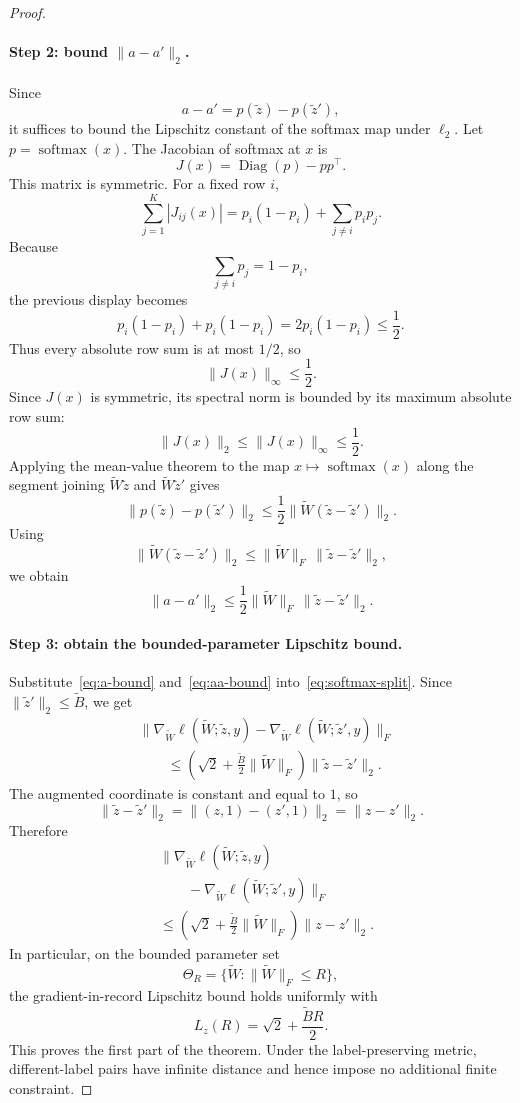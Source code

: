 \documentclass[conference,compsoc]{IEEEtran}
\DeclareMathOperator{\softmax}{softmax}
\begin{document}
\begin{proof}
\paragraph{Step 2: bound $\|a-a'\|_2$.}
Since
\[
a-a'=p(\widetilde z)-p(\widetilde z'),
\]
it suffices to bound the Lipschitz constant of the softmax map under $\ell_2$. Let $p=\softmax(x)$. The Jacobian of softmax at $x$ is
\[
J(x)=\operatorname{Diag}(p)-pp^\top.
\]
This matrix is symmetric. For a fixed row $i$,
\[
\sum_{j=1}^K |J_{ij}(x)|
=
p_i(1-p_i)+\sum_{j\neq i}p_ip_j.
\]
Because
\[
\sum_{j\neq i}p_j=1-p_i,
\]
the previous display becomes
\[
p_i(1-p_i)+p_i(1-p_i)
=
2p_i(1-p_i)
\le
\frac{1}{2}.
\]
Thus every absolute row sum is at most $1/2$, so
\[
\|J(x)\|_\infty\le \frac{1}{2}.
\]
Since $J(x)$ is symmetric, its spectral norm is bounded by its maximum absolute row sum:
\[
\|J(x)\|_2\le \|J(x)\|_\infty\le \frac{1}{2}.
\]
Applying the mean-value theorem to the map $x\mapsto\softmax(x)$ along the segment joining $\widetilde W\widetilde z$ and $\widetilde W\widetilde z'$ gives
\[
\|p(\widetilde z)-p(\widetilde z')\|_2
\le
\frac{1}{2}\|\widetilde W(\widetilde z-\widetilde z')\|_2.
\]
Using
\[
\|\widetilde W(\widetilde z-\widetilde z')\|_2
\le
\|\widetilde W\|_F\,\|\widetilde z-\widetilde z'\|_2,
\]
we obtain
\begin{equation}
\label{eq:aa-bound}
\|a-a'\|_2
\le
\frac{1}{2}\|\widetilde W\|_F\,\|\widetilde z-\widetilde z'\|_2.
\end{equation}

\paragraph{Step 3: obtain the bounded-parameter Lipschitz bound.}
Substitute~\eqref{eq:a-bound} and~\eqref{eq:aa-bound} into~\eqref{eq:softmax-split}. Since $\|\widetilde z'\|_2\le \widetilde B$, we get
\[
\begin{aligned}
&\bigl\|
\nabla_{\widetilde W}\ell(\widetilde W;\widetilde z,y)
-
\nabla_{\widetilde W}\ell(\widetilde W;\widetilde z',y)
\bigr\|_F \\
&\qquad\le
\left(
\sqrt{2}
+
\frac{\widetilde B}{2}\|\widetilde W\|_F
\right)
\|\widetilde z-\widetilde z'\|_2 .
\end{aligned}
\]
The augmented coordinate is constant and equal to $1$, so
\[
\|\widetilde z-\widetilde z'\|_2
=
\|(z,1)-(z',1)\|_2
=
\|z-z'\|_2.
\]
Therefore
\[
\begin{aligned}
&\bigl\|
\nabla_{\widetilde W}\ell(\widetilde W;\widetilde z,y) \\
&\qquad -
\nabla_{\widetilde W}\ell(\widetilde W;\widetilde z',y)
\bigr\|_F \\
&\le
\left(
\sqrt{2}
+
\frac{\widetilde B}{2}\|\widetilde W\|_F
\right)
\|z-z'\|_2.
\end{aligned}
\]
In particular, on the bounded parameter set
\[
\Theta_R
=
\{\widetilde W:\|\widetilde W\|_F\le R\},
\]
the gradient-in-record Lipschitz bound holds uniformly with
\[
L_z(R)
=
\sqrt{2}+\frac{\widetilde B R}{2}.
\]
This proves the first part of the theorem. Under the label-preserving metric, different-label pairs have infinite distance and hence impose no additional finite constraint.


\end{proof}
\end{document}
